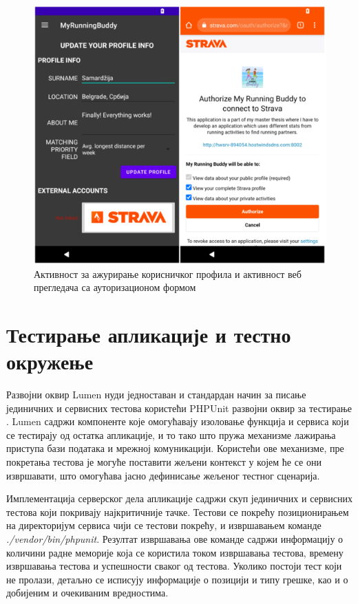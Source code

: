 \documentclass[12pt,oneside]{memoir}
\begin{document}
\begin{figure}[!ht]
  \centering
  \includegraphics[scale=0.7]{slike/azuriranje-autorizacija.png}
  \caption{Активност за ажурирање корисничког профила и активност веб прегледача са ауторизационом формом}
  \label{fig:azuriranje_autorizacija}
\end{figure}

\section{Тестирање апликације и тестно окружење}
Развојни оквир Lumen нуди једноставан и стандардан начин за писање јединичних и сервисних тестова користећи PHPUnit развојни оквир за тестирање \cite{phpunit}. Lumen садржи компоненте које омогућавају изоловање функција и сервиса који се тестирају од остатка апликације, и то тако што пружа механизме лажирања приступа бази података и мрежној комуникацији. Користећи ове механизме, пре покретања тестова је могуће поставити жељени контекст у којем ће се они извршавати, што омогућава јасно дефинисање жељеног тестног сценарија.

Имплементација серверског дела апликације садржи скуп јединичних и сервисних тестова који покривају најкритичније тачке. Тестови се покрећу позиционирањем на директоријум сервиса чији се тестови покрећу, и извршавањем команде \textit{./vendor/bin/phpunit}. Резултат извршавања ове команде садржи информацију о количини радне меморије која се користила током извршавања тестова, времену извршавања тестова и успешности сваког од тестова. Уколико постоји тест који не пролази, детаљно се исписују информације о позицији и типу грешке, као и о добијеним и очекиваним вредностима.
\end{document}
